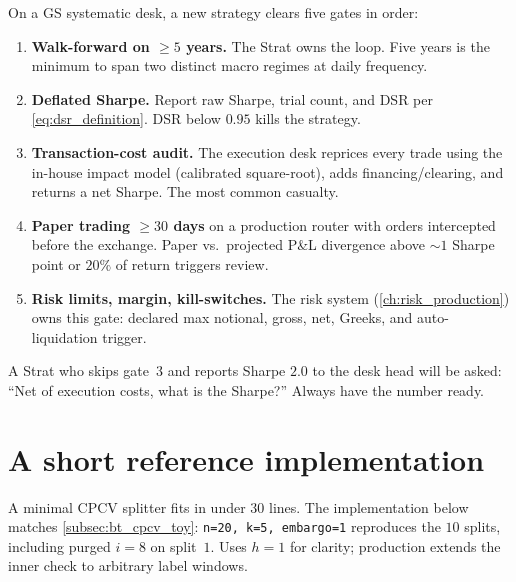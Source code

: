 \begin{gsbox}
On a GS systematic desk, a new strategy clears five gates in order:

\begin{enumerate}
  \item \textbf{Walk-forward on $\geq 5$ years.} The Strat owns
  the loop. Five years is the minimum to span two distinct
  macro regimes at daily frequency.
  \item \textbf{Deflated Sharpe.} Report raw Sharpe, trial
  count, and DSR per \eqref{eq:dsr_definition}. DSR below
  $0.95$ kills the strategy.
  \item \textbf{Transaction-cost audit.} The execution desk
  reprices every trade using the in-house impact model
  (calibrated square-root), adds financing/clearing, and
  returns a net Sharpe. The most common casualty.
  \item \textbf{Paper trading $\geq 30$ days} on a production
  router with orders intercepted before the exchange. Paper
  vs.\ projected P\&L divergence above $\sim 1$ Sharpe point
  or $20\%$ of return triggers review.
  \item \textbf{Risk limits, margin, kill-switches.} The risk
  system (\cref{ch:risk_production}) owns this gate: declared
  max notional, gross, net, Greeks, and auto-liquidation
  trigger.
\end{enumerate}
A Strat who skips gate~3 and reports Sharpe $2.0$ to the desk head
will be asked: ``Net of execution costs, what is the Sharpe?''
Always have the number ready.
\end{gsbox}

\section{A short reference implementation}
\label{sec:bt_reference_impl}

A minimal CPCV splitter fits in under $30$ lines. The implementation
below matches \cref{subsec:bt_cpcv_toy}: \texttt{n=20, k=5,
embargo=1} reproduces the $10$ splits, including purged $i = 8$ on
split~$1$. Uses $h = 1$ for clarity; production extends the inner
check to arbitrary label windows.

